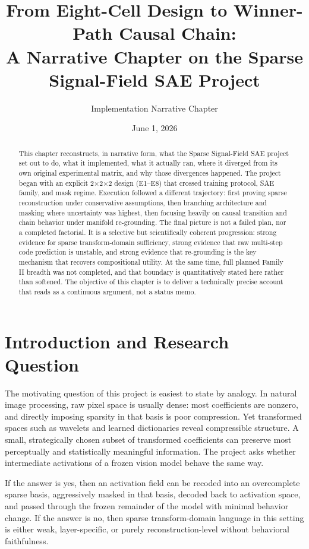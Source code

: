 \documentclass[11pt]{article}
\title{From Eight-Cell Design to Winner-Path Causal Chain:\\A Narrative Chapter on the Sparse Signal-Field SAE Project}
\author{Implementation Narrative Chapter}
\date{June 1, 2026}
\begin{document}
\maketitle

\begin{abstract}
This chapter reconstructs, in narrative form, what the Sparse Signal-Field SAE project set out to do, what it implemented, what it actually ran, where it diverged from its own original experimental matrix, and why those divergences happened. The project began with an explicit 2$\times$2$\times$2 design (E1--E8) that crossed training protocol, SAE family, and mask regime. Execution followed a different trajectory: first proving sparse reconstruction under conservative assumptions, then branching architecture and masking where uncertainty was highest, then focusing heavily on causal transition and chain behavior under manifold re-grounding. The final picture is not a failed plan, nor a completed factorial. It is a selective but scientifically coherent progression: strong evidence for sparse transform-domain sufficiency, strong evidence that raw multi-step code prediction is unstable, and strong evidence that re-grounding is the key mechanism that recovers compositional utility. At the same time, full planned Family II breadth was not completed, and that boundary is quantitatively stated here rather than softened. The objective of this chapter is to deliver a technically precise account that reads as a continuous argument, not a status memo.
\end{abstract}

\section{Introduction and Research Question}
The motivating question of this project is easiest to state by analogy. In natural image processing, raw pixel space is usually dense: most coefficients are nonzero, and directly imposing sparsity in that basis is poor compression. Yet transformed spaces such as wavelets and learned dictionaries reveal compressible structure. A small, strategically chosen subset of transformed coefficients can preserve most perceptually and statistically meaningful information. The project asks whether intermediate activations of a frozen vision model behave the same way.

If the answer is yes, then an activation field can be recoded into an overcomplete sparse basis, aggressively masked in that basis, decoded back to activation space, and passed through the frozen remainder of the model with minimal behavior change. If the answer is no, then sparse transform-domain language in this setting is either weak, layer-specific, or purely reconstruction-level without behavioral faithfulness.
\end{document}
